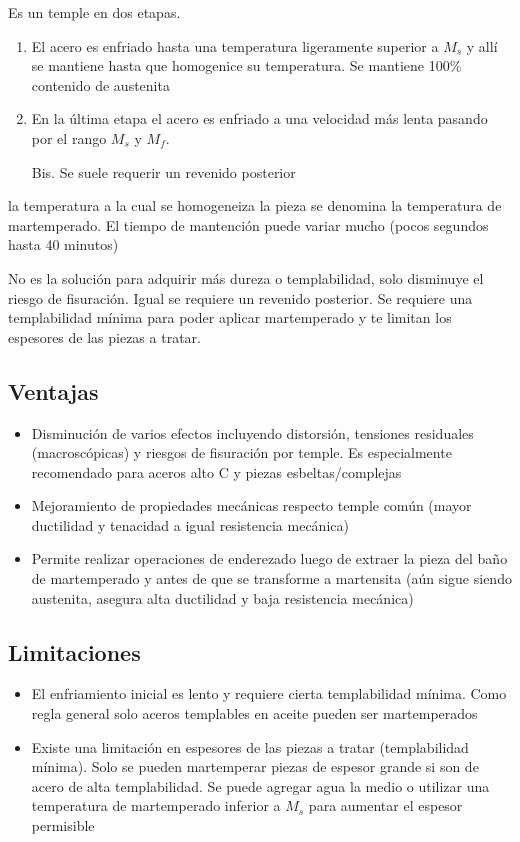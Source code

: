 Es un temple en dos etapas.
\begin{enumerate}
	\item El acero es enfriado hasta una temperatura ligeramente superior a $M_s$ y allí se mantiene hasta que homogenice su temperatura. Se mantiene 100\% contenido de austenita
	\item En la última etapa el acero es enfriado a una velocidad más lenta pasando por el rango $M_s$ y $M_f$.
	\item[Bis.] Se suele requerir un revenido posterior
\end{enumerate}
la temperatura a la cual se homogeneiza la pieza se denomina la temperatura de martemperado. El tiempo de mantención puede variar mucho (pocos segundos hasta 40 minutos)

No es la solución para adquirir más dureza o templabilidad, solo disminuye el riesgo de fisuración. Igual se requiere un revenido posterior. Se requiere una templabilidad mínima para poder aplicar martemperado y te limitan los espesores de las piezas a tratar.

\subsection{Ventajas}
\begin{itemize}
	\item Disminución de varios efectos incluyendo distorsión, tensiones residuales (macroscópicas) y riesgos de fisuración por temple. Es especialmente recomendado para aceros alto C y piezas esbeltas/complejas
	\item Mejoramiento de propiedades mecánicas respecto temple común (mayor ductilidad y tenacidad a igual resistencia mecánica)
	\item Permite realizar operaciones de enderezado luego de extraer la pieza del baño de martemperado y antes de que se transforme a martensita (aún sigue siendo austenita, asegura alta ductilidad y baja resistencia mecánica)
\end{itemize}



\subsection{Limitaciones}
\begin{itemize}
	\item El enfriamiento inicial es lento y requiere cierta templabilidad mínima. Como regla general solo aceros templables en aceite pueden ser martemperados
	\item Existe una limitación en espesores de las piezas a tratar (templabilidad mínima). Solo se pueden martemperar piezas de espesor grande si son de acero de alta templabilidad. Se puede agregar agua la medio o utilizar una temperatura de martemperado inferior a $M_s$ para aumentar el espesor permisible
\end{itemize}

